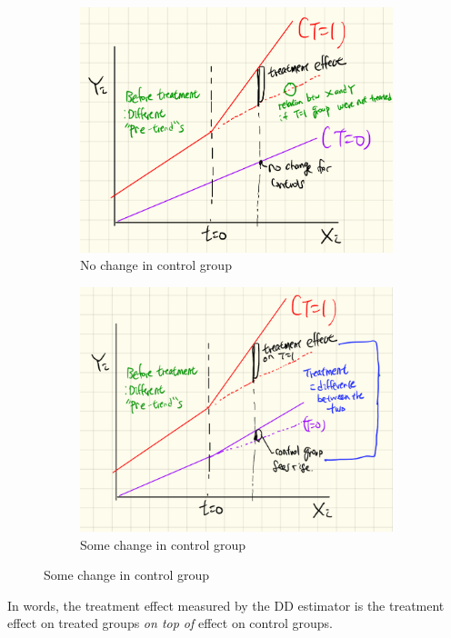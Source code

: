 \documentclass[12pt]{article}
\theoremstyle{definition}
\theoremstyle{property}
\theoremstyle{assumption}
\theoremstyle{example}
\theoremstyle{comment}
\begin{document}
\begin{figure}[H]
\centering 
\caption{DD estimator}
\begin{subfigure}[b]{.4\textwidth}
\includegraphics[width=\textwidth]{fig1_1.png}
\caption{No change in control group}
\end{subfigure}
\begin{subfigure}[b]{.4\textwidth}
\includegraphics[width=\textwidth]{fig1_2.png}
\caption{Some change in control group}
\end{subfigure}
\end{figure}
In words, the treatment effect measured by the DD estimator is the treatment effect on treated groups \textit{on top of} effect on control groups. 
\end{document}
